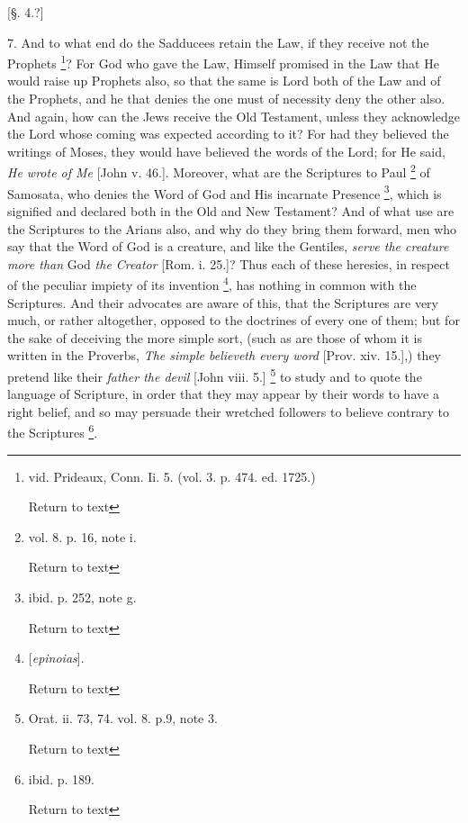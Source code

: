 [§. 4.?]

7. And to what end do the Sadducees retain the
Law, if they receive not the Prophets \footnote{vid. Prideaux, Conn. Ii. 5. (vol. 3. p. 474. ed. 1725.)

Return to text}? For God who gave the Law, Himself promised in the Law that He
would raise up Prophets also, so that the same is Lord both of the Law
and of the Prophets, and he that denies the one must of necessity deny
the other also. And again, how can the Jews receive the Old Testament,
unless they acknowledge the Lord whose coming was expected according
to it? For had they believed the writings of Moses, they would have
believed the words of the Lord; for He said, \emph{He wrote of Me}
[John v. 46.]. Moreover, what are the Scriptures to Paul \footnote{vol. 8. p. 16, note i.

Return to text} of Samosata, who denies the Word of God and His incarnate
Presence \footnote{ibid. p. 252, note g.

Return to text}, which is
signified and declared both in the Old and New Testament? And of what
use are the Scriptures to the Arians also, and why do they bring them
forward, men who say that the Word of God is a creature, and like the
Gentiles, \emph{serve the creature more than} God \emph{the Creator}
[Rom. i. 25.]? Thus each of these heresies, in respect of the peculiar
impiety of its invention \footnote{[\emph{epinoias}].

Return to text},
has nothing in common with the Scriptures. And their advocates are
aware of this, that the Scriptures are very much, or rather
altogether, opposed to the doctrines of every one of them; but for the
sake of deceiving the more simple sort, (such as are those of whom it
is written in the Proverbs, \emph{The simple believeth every word} [Prov.
xiv. 15.],) they pretend like their \emph{father the devil} [John
viii. 5.] \footnote{Orat. ii. 73, 74. vol. 8. p.9, note 3.

Return to text} to study
and to quote the language of Scripture, in order that they may appear
by their words to have a right belief, and so may persuade their
wretched followers to believe contrary to the Scriptures \footnote{ibid. p. 189.

Return to text}.

